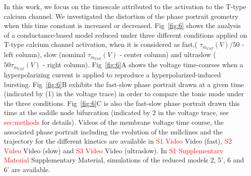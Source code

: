 In this work, we focus on the timescale attributed to the activation to the T-type calcium channel.  We investigated the distortion of the phase portrait geometry when this time constant is increased or decreased.  Fig~\ref{fig:6} shows the analysis of a conductance-based model reduced under three different conditions applied on T-type calcium channel activation, when it is considered as fast,( $\tau_{m_{CaT}}(V)/50$ - left column), slow (nominal $\tau_{m_{CaT}}(V)$ - center column) and ultraslow ($50 \tau_{m_{CaT}}(V)$ - right column).  Fig~\ref{fig:6}A shows the voltage time-courses when a hyperpolarizing current is applied to reproduce a hyperpolarized-induced bursting. Fig~\ref{fig:6}B exhibits the fast-slow phase portrait drawn at a given time (indicated by (1) in the voltage trace) in order to compare the tonic mode under the three conditions.  Fig~\ref{fig:6}C is also the fast-slow phase portrait drawn this time at the saddle node bifurcation (indicated by 2 in the voltage trace, see \textcolor{red}{sec:methods} for details). Videos of the membrane voltage time course, the associated phase portrait including the evolution of the nullclines and the trajectory for the different kinetics are available in \textcolor{red}{S1 Video} Video (fast),  \textcolor{red}{S2 Video} Video (slow) and \textcolor{red}{S3 Video} Video (ultraslow).  In \textcolor{red}{S1 Supplementary Material} Supplementary Material, simulations of the reduced models 2, 5', 6 and 6' are available.

